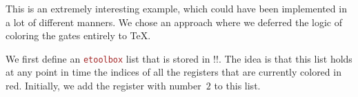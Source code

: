 \documentclass{scrartcl}
\makeatletter
\newenvironment{codeexample*}{%
   \VerbatimEnvironment%
   \let\FVB@VerbatimOut\minted@FVB@VerbatimOut
   \let\FVE@VerbatimOut\minted@FVE@VerbatimOut
   \minted@configlang{tex}%
   \minted@fvset
   \begin{VerbatimOut}[codes={\catcode`\^^I=12},firstline,lastline]{\minted@jobname.pyg}%
}{
   \end{VerbatimOut}%
   \minted@langlinenoson%
   \begin{adjustbox}{center}
       \minted@jobname.pyg %
   \end{adjustbox}\nopagebreak
   \minted@pygmentize{\minted@lang}%
   \minted@langlinenosoff%
   \par%
}
\def\pkg#1{\textcolor{brown}{\texttt{#1}}}
\makeatother
\begin{document}
            \begin{example}
               \begin{codeexample*}
               \end{codeexample*}
               This is an extremely interesting example, which could have been implemented in a lot of different manners.
               We chose an approach where we deferred the logic of coloring the gates entirely to \TeX.

               We first define an \pkg{etoolbox} list that is stored in \tex!\high!.
               The idea is that this list holds at any point in time the indices of all the registers that are currently colored in red.
               Initially, we add the register with number~$2$ to this list.


\end{example}
\end{document}
